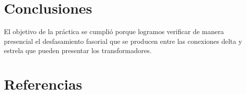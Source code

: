 \documentclass[]{article}
\begin{document}
	
	\section{Conclusiones}
	
	El objetivo de la práctica se cumplió porque logramos verificar de manera presencial el desfasamiento fasorial que se producen entre las conexiones delta y estrela que pueden presentar los transformadores.

	\section{Referencias}
	

	
    
    


	
	
\end{document}
